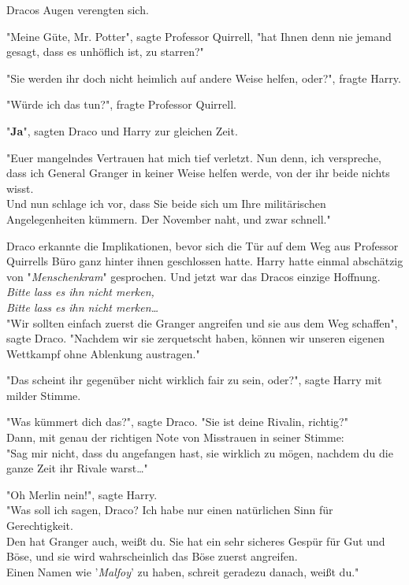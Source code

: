 {Dracos Augen verengten sich.

"Meine Güte, Mr. Potter", sagte Professor Quirrell, "hat Ihnen denn nie jemand gesagt, dass es unhöflich ist, zu starren?"

"Sie werden ihr doch nicht heimlich auf andere Weise helfen, oder?", fragte Harry.

"Würde ich das tun?", fragte Professor Quirrell.

"\textbf{Ja}", sagten Draco und Harry zur gleichen Zeit.

"Euer mangelndes Vertrauen hat mich tief verletzt. Nun denn, ich verspreche, dass ich General Granger in keiner Weise helfen werde, von der ihr beide nichts wisst.\\ Und nun schlage ich vor, dass Sie beide sich um Ihre militärischen Angelegenheiten kümmern. Der November naht, und zwar schnell."

Draco erkannte die Implikationen, bevor sich die Tür auf dem Weg aus Professor Quirrells Büro ganz hinter ihnen geschlossen hatte. Harry hatte einmal abschätzig von "\emph{Menschenkram}" gesprochen. Und jetzt war das Dracos einzige Hoffnung.\\ \emph{Bitte lass es ihn nicht merken,}\\ \emph{Bitte lass es ihn nicht merken…}\\ "Wir sollten einfach zuerst die Granger angreifen und sie aus dem Weg schaffen", sagte Draco. "Nachdem wir sie zerquetscht haben, können wir unseren eigenen Wettkampf ohne Ablenkung austragen."

"Das scheint ihr gegenüber nicht wirklich fair zu sein, oder?", sagte Harry mit milder Stimme.

"Was kümmert dich das?", sagte Draco. "Sie ist deine Rivalin, richtig?"\\ Dann, mit genau der richtigen Note von Misstrauen in seiner Stimme:\\ "Sag mir nicht, dass du angefangen hast, sie wirklich zu mögen, nachdem du die ganze Zeit ihr Rivale warst…"

"Oh Merlin nein!", sagte Harry.\\ "Was soll ich sagen, Draco? Ich habe nur einen natürlichen Sinn für Gerechtigkeit.\\ Den hat Granger auch, weißt du. Sie hat ein sehr sicheres Gespür für Gut und Böse, und sie wird wahrscheinlich das Böse zuerst angreifen.\\ Einen Namen wie '\emph{Malfoy}' zu haben, schreit geradezu danach, weißt du."

}

